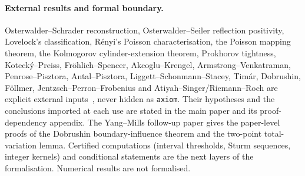 \paragraph{External results and formal boundary.}
Osterwalder--Schrader reconstruction, Osterwalder--Seiler reflection
positivity, Lovelock's classification, R\'enyi's Poisson characterisation,
the Poisson mapping theorem, the Kolmogorov cylinder-extension theorem,
Prokhorov tightness, Koteck\'y--Preiss, Fröhlich--Spencer,
Akcoglu--Krengel, Armstrong--Venkatraman, Penrose--Pisztora,
Antal--Pisztora, Liggett--Schonmann--Stacey, Timár, Dobrushin, Föllmer,
Jentzsch--Perron--Frobenius and Atiyah--Singer/Riemann--Roch are explicit
external inputs~\cite{OS1973,OS1975,OS1978,Lovelock1971,Renyi1967,Kingman1993,Kallenberg2002,KP1986,FS1982,AK1981,AV2023,PP1996,AP1996,LSS1997,Timar2013,Dobrushin1968,Foellmer1982,Jentzsch1912,AtiyahSinger1968,Hall2015,Kallen1952,Lehmann1954}, never hidden as \texttt{axiom}. Their hypotheses and the
conclusions imported at each use are stated in the main paper and its
proof-dependency appendix. The Yang--Mills follow-up paper gives the
paper-level proofs of the Dobrushin boundary-influence theorem and the
two-point total-variation lemma. Certified computations (interval thresholds,
Sturm sequences, integer kernels) and conditional statements are the next
layers of the formalisation. Numerical results are not formalised.
